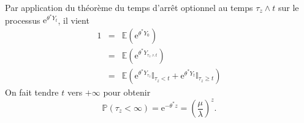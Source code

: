 \documentclass[11pts, answers]{exam}
\newcommand*{\Prob}{\mathbb{P}}
\newcommand*{\E}{\mathbb{E}}
\newcommand*{\e}{\mathrm{e}}
\newcommand*{\ind}{\mathbb{I}}
\begin{document}
\begin{questions}
\begin{parts}
\begin{solution}
Par application du théorème du temps d'arrêt optionnel au temps $\tau_z\land t$ sur le processus $\e^{\theta^\ast Y_t}$, il vient 
\begin{eqnarray*}
1 &=&\E(\e^{\theta^\ast Y_0})\\
&=&\E(\e^{\theta^\ast Y_{\tau_z\land t}})\\
&=&\E(\e^{\theta^\ast Y_{\tau_z}}\ind_{\tau_z < t}+\e^{\theta^\ast Y_{t}}\ind_{\tau_z \geq t})
\end{eqnarray*}
On fait tendre $t$ vers $+\infty$ pour obtenir
$$
\Prob(\tau_z <\infty) = \e^{-\theta^\ast z} = \left(\frac{\mu}{\lambda}\right)^z.
$$
\end{solution}
\end{parts}
\end{questions}
\end{document}
